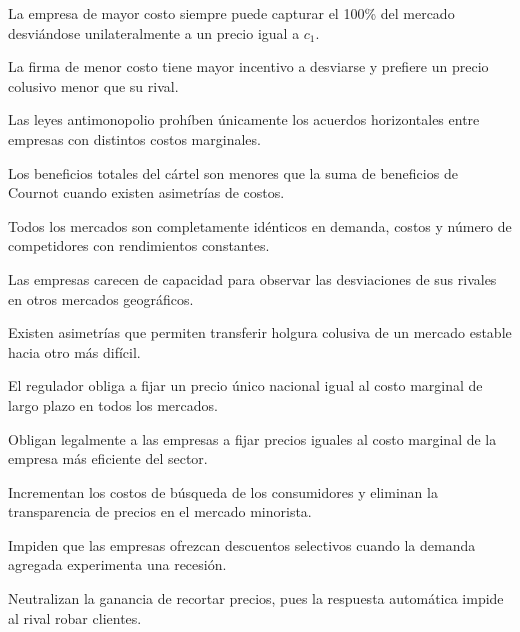 \begin{opts}
    \item La empresa de mayor costo siempre puede capturar el 100\% del mercado desviándose unilateralmente a un precio igual a $c_1$.
    \item La firma de menor costo tiene mayor incentivo a desviarse y prefiere un precio colusivo menor que su rival.
    \item Las leyes antimonopolio prohíben únicamente los acuerdos horizontales entre empresas con distintos costos marginales.
    \item Los beneficios totales del cártel son menores que la suma de beneficios de Cournot cuando existen asimetrías de costos.
\end{opts}

\begin{opts}
    \item Todos los mercados son completamente idénticos en demanda, costos y número de competidores con rendimientos constantes.
    \item Las empresas carecen de capacidad para observar las desviaciones de sus rivales en otros mercados geográficos.
    \item Existen asimetrías que permiten transferir holgura colusiva de un mercado estable hacia otro más difícil.
    \item El regulador obliga a fijar un precio único nacional igual al costo marginal de largo plazo en todos los mercados.
\end{opts}

\begin{opts}
    \item Obligan legalmente a las empresas a fijar precios iguales al costo marginal de la empresa más eficiente del sector.
    \item Incrementan los costos de búsqueda de los consumidores y eliminan la transparencia de precios en el mercado minorista.
    \item Impiden que las empresas ofrezcan descuentos selectivos cuando la demanda agregada experimenta una recesión.
    \item Neutralizan la ganancia de recortar precios, pues la respuesta automática impide al rival robar clientes.
\end{opts}


